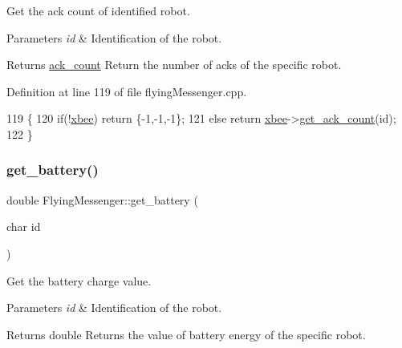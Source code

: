 Get the ack count of identified robot. 


\begin{DoxyParams}{Parameters}
{\em id} & Identification of the robot. \\
\hline
\end{DoxyParams}
\begin{DoxyReturn}{Returns}
\hyperlink{structack__count}{ack\+\_\+count} Return the number of acks of the specific robot. 
\end{DoxyReturn}


Definition at line 119 of file flying\+Messenger.\+cpp.


\begin{DoxyCode}
119                                                 \{
120     \textcolor{keywordflow}{if}(!\hyperlink{class_flying_messenger_a419820a45ea2bc496c10bf36b7b49033}{xbee}) \textcolor{keywordflow}{return} \{-1,-1,-1\};
121     \textcolor{keywordflow}{else} \textcolor{keywordflow}{return} \hyperlink{class_flying_messenger_a419820a45ea2bc496c10bf36b7b49033}{xbee}->\hyperlink{class_serial_com_af3bb19785d37bfbd6fde36e107fed1b1}{get\_ack\_count}(\textcolor{keywordtype}{id});
122 \}
\end{DoxyCode}
\mbox{\label{class_flying_messenger_a8d9bc3b74d2cbad7bcefd2acf17205fd}} 
\subsubsection{\texorpdfstring{get\+\_\+battery()}{get\_battery()}}
{\footnotesize\ttfamily double Flying\+Messenger\+::get\+\_\+battery (\begin{DoxyParamCaption}\item[{char}]{id }\end{DoxyParamCaption})}



Get the battery charge value. 


\begin{DoxyParams}{Parameters}
{\em id} & Identification of the robot. \\
\hline
\end{DoxyParams}
\begin{DoxyReturn}{Returns}
double Returns the value of battery energy of the specific robot. 
\end{DoxyReturn}



